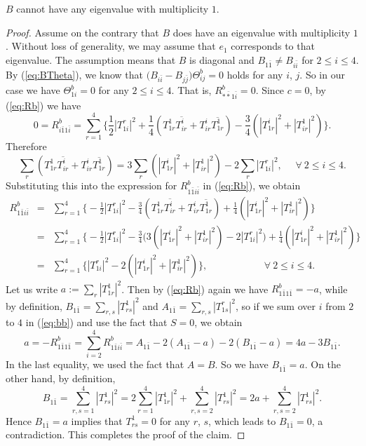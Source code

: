 \documentclass{amsart}
\begin{document}
 $B$ cannot have any eigenvalue with multiplicity $1$.
\begin{proof} Assume on the contrary that $B$ does have an eigenvalue with multiplicity $1$. Without loss of generality, we may assume that $e_1$ corresponds to that eigenvalue. The assumption means that $B$ is diagonal and $B_{1\bar{1}}\neq B_{i\bar{i}}$ for $2\leq i\leq 4$. By (\ref{eq:BTheta}), we know that $\big( B_{i\bar{i}} - B_{j\bar{j}}\big) \Theta^b_{ij} =0$ holds for any $i$, $j$. So in our case we have $\Theta^b_{1i}=0$ for any $2\leq i\leq 4$. That is, $R^b_{\ast \bar{\ast}1\bar{i}}=0$. Since $c=0$, by (\ref{eq:Rb}) we have
$$ 0 = R^b_{i\bar{1}1\bar{i}} = \sum_{r=1}^4 \big\{ \frac{1}{2} |T^r_{1i}|^2 + \frac{1}{4} (T^1_{1r} \overline{T^i_{ir}} + T^i_{ir} \overline{T^1_{1r}})  -\frac{3}{4} ( |T^i_{1r}|^2 + |T^1_{ir}|^2 ) \big\}.$$
Therefore
 $$ \sum_r (T^1_{1r} \overline{T^i_{ir}} + T^i_{ir} \overline{T^1_{1r}}) = 3 \sum_r ( |T^i_{1r}|^2 + |T^1_{ir}|^2 ) - 2\sum_r |T^r_{1i}|^2, \ \ \ \ \ \ \forall \ 2\leq i\leq 4.
 $$
Substituting this into the expression for $R^b_{1\bar{1}i\bar{i}}$ in (\ref{eq:Rb}), we obtain
\begin{eqnarray}
R^b_{1\bar{1}i\bar{i}} & = & \sum_{r=1}^4 \big\{ -\frac{1}{2} |T^r_{1i}|^2 - \frac{3}{4} (T^1_{1r} \overline{T^i_{ir}} + T^i_{ir} \overline{T^1_{1r}})  +\frac{1}{4} ( |T^i_{1r}|^2 + |T^1_{ir}|^2 ) \big\} \nonumber \\
& = & \sum_{r=1}^4 \big\{ -\frac{1}{2} |T^r_{1i}|^2 - \frac{3}{4} \big( 3( |T^i_{1r}|^2 + |T^1_{ir}|^2 ) - 2 |T^r_{1i}|^2 \big)   +\frac{1}{4} ( |T^i_{1r}|^2 + |T^1_{ir}|^2 ) \big\} \nonumber \\
& = & \sum_{r=1}^4 \big\{  |T^r_{1i}|^2 - 2 ( |T^i_{1r}|^2 + |T^1_{ir}|^2 ) \big\}, \ \ \ \ \ \ \ \ \ \ \ \ \  \ \ \ \ \ \ \ \ \ \ \ \ \ \forall \ 2\leq i\leq 4. \label{eq:bb}
\end{eqnarray}
Let us write $a:=\sum_r|T^1_{1r}|^2$. Then by (\ref{eq:Rb}) again we have $R^b_{1\bar{1}1\bar{1}}=-a$, while by definition, $B_{1\bar{1}}=\sum_{r,s} |T^1_{rs}|^2$ and $A_{1\bar{1}}=\sum_{r,s} |T^r_{1s}|^2$, so if we sum over $i$ from $2$ to $4$ in (\ref{eq:bb}) and use the fact that $S=0$, we obtain
$$ a=-R^b_{1\bar{1}1\bar{1}} = \sum_{i=2}^4 R^b_{1\bar{1}i\bar{i}}  = A_{1\bar{1}} -2(A_{1\bar{1}}-a) -2(B_{1\bar{1}}-a) =4a-3B_{1\bar{1}}.$$
In the last equality, we used the fact that $A=B$. So we have $B_{1\bar{1}}=a$. On the other hand, by definition,
$$ B_{1\bar{1}} =\sum_{r,s=1}^4 |T^1_{rs}|^2 = 2\sum_{r=1}^4|T^1_{1r}|^2 + \sum_{r,s=2}^4 |T^1_{rs}|^2 = 2a + \sum_{r,s=2}^4 |T^1_{rs}|^2. $$
Hence $B_{1\bar{1}}=a$ implies that $T^1_{rs}=0$ for any $r$, $s$, which leads to $B_{1\bar{1}}=0$, a contradiction. This completes the proof of the claim.
\end{proof}
\end{document}
